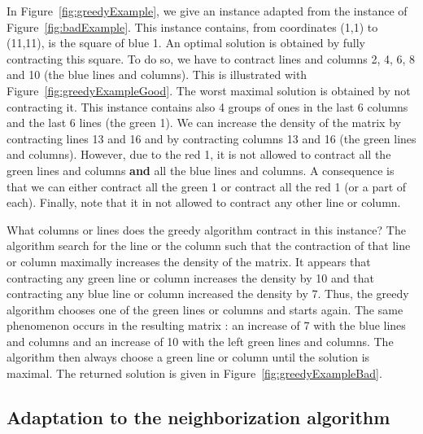 In Figure~\ref{fig:greedyExample}, we give an instance adapted from the instance of Figure~\ref{fig:badExample}. This instance contains, from coordinates (1,1) to (11,11), is the square of blue 1. An optimal solution is obtained by fully contracting this square. To do so, we have to contract lines and columns 2, 4, 6, 8 and 10 (the blue lines and columns). This is illustrated with Figure~\ref{fig:greedyExampleGood}. The worst maximal solution is obtained by not contracting it. This instance contains also 4 groups of ones in the last 6 columns and the last 6 lines (the green 1). We can increase the density of the matrix by contracting lines 13 and 16 and by contracting columns 13 and 16 (the green lines and columns). However, due to the red 1, it is not allowed to contract all the green lines and columns \textbf{and} all the blue lines and columns. A consequence is that we can either contract all the green 1 or contract all the red 1 (or a part of each). Finally, note that it in not allowed to contract any other line or column.

What columns or lines does the greedy algorithm contract in this instance? The algorithm search for the line or the column such that the contraction of that line or column maximally increases the density of the matrix. It appears that contracting any green line or column increases the density by 10 and that contracting any blue line or column increased the density by 7. Thus, the greedy algorithm chooses one of the green lines or columns and starts again. The same phenomenon occurs in the resulting matrix : an increase of 7 with the blue lines and columns and an increase of 10 with the left green lines and columns. The algorithm then always choose a green line or column until the solution is maximal. The returned solution is given in Figure~\ref{fig:greedyExampleBad}.



\renewcommand{\gridsize}{0.5}




\subsection{Adaptation to the neighborization algorithm}

